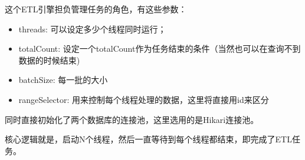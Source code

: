 \documentclass[12pt]{article}
\begin{document}
这个ETL引擎担负管理任务的角色，有这些参数：

\begin{itemize}
\tightlist
\item
  threads: 可以设定多少个线程同时运行；
\item
  totalCount: 设定一个totalCount作为任务结束的条件（当然也可以在查询不到数据的时候结束)
\item
  batchSize: 每一批的大小
\item
  rangeSelector: 用来控制每个线程处理的数据，这里将直接用id来区分
\end{itemize}

同时直接初始化了两个数据库的连接池，这里选用的是Hikari连接池。

\begin{Shaded}
\begin{Highlighting}[]
  \OperatorTok{()}   \OperatorTok{\{}
     \OperatorTok{=}  \OperatorTok{(}\OperatorTok{);}
     \OperatorTok{(}\OperatorTok{=} \OperatorTok{;}\OperatorTok{\textless{}}\OperatorTok{;}\OperatorTok{++)} \OperatorTok{\{}
        \OperatorTok{=}  \OperatorTok{(} \OperatorTok{(}\OperatorTok{,}
\OperatorTok{,}
\OperatorTok{,}
\OperatorTok{,}
\OperatorTok{,}
\OperatorTok{));}
\OperatorTok{(}\OperatorTok{);}
    \OperatorTok{\}}
\OperatorTok{(}\OperatorTok{::}\OperatorTok{);}
\OperatorTok{();}
\OperatorTok{();}
\OperatorTok{\}}
\end{Highlighting}
\end{Shaded}

核心逻辑就是，启动N个线程，然后一直等待到每个线程都结束，即完成了ETL任务。
\end{document}
